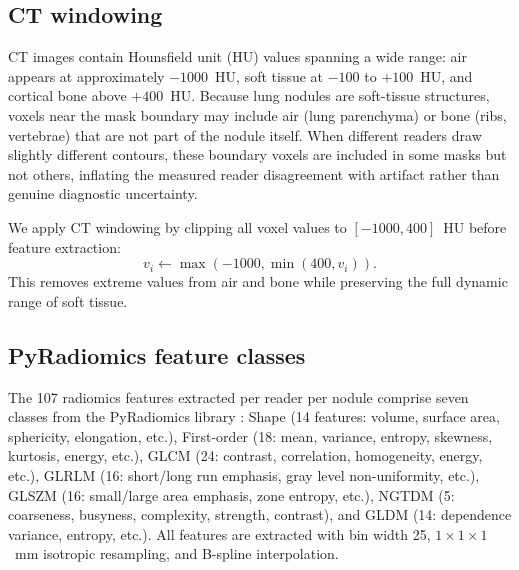\documentclass[referee,lineno,pdflatex,sn-vancouver-num]{sn-jnl}
\begin{document}
\begin{appendices}
\subsection{CT windowing}

CT images contain Hounsfield unit (HU) values spanning a wide range: air appears at approximately $-1000$~HU, soft tissue at $-100$ to $+100$~HU, and cortical bone above $+400$~HU.
Because lung nodules are soft-tissue structures, voxels near the mask boundary may include air (lung parenchyma) or bone (ribs, vertebrae) that are not part of the nodule itself.
When different readers draw slightly different contours, these boundary voxels are included in some masks but not others, inflating the measured reader disagreement with artifact rather than genuine diagnostic uncertainty.

We apply CT windowing by clipping all voxel values to $[-1000, 400]$~HU before feature extraction:
\[
  v_i \gets \max(-1000, \min(400, v_i)).
\]
This removes extreme values from air and bone while preserving the full dynamic range of soft tissue.

\subsection{PyRadiomics feature classes}

The 107 radiomics features extracted per reader per nodule comprise seven classes from the PyRadiomics library \cite{vanGriethuysen2017}:
Shape (14 features: volume, surface area, sphericity, elongation, etc.),
First-order (18: mean, variance, entropy, skewness, kurtosis, energy, etc.),
GLCM (24: contrast, correlation, homogeneity, energy, etc.),
GLRLM (16: short/long run emphasis, gray level non-uniformity, etc.),
GLSZM (16: small/large area emphasis, zone entropy, etc.),
NGTDM (5: coarseness, busyness, complexity, strength, contrast),
and GLDM (14: dependence variance, entropy, etc.).
All features are extracted with bin width 25, $1 \times 1 \times 1$~mm isotropic resampling, and B-spline interpolation.

\end{appendices}


\end{document}
